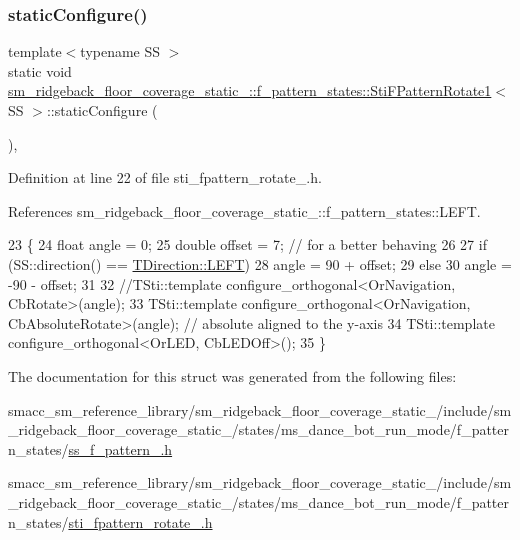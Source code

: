 \subsubsection{\texorpdfstring{static\+Configure()}{staticConfigure()}}
{\footnotesize\ttfamily template$<$typename SS $>$ \\
static void \hyperlink{classsm__ridgeback__floor__coverage__static__1_1_1f__pattern__states_1_1StiFPatternRotate1}{sm\+\_\+ridgeback\+\_\+floor\+\_\+coverage\+\_\+static\+\_\+::f\+\_\+pattern\+\_\+states\+::\+Sti\+F\+Pattern\+Rotate1}$<$ SS $>$\+::static\+Configure (\begin{DoxyParamCaption}{ }\end{DoxyParamCaption})\hspace{0.3cm}{\ttfamily [inline]}, {\ttfamily [static]}}



Definition at line 22 of file sti\+\_\+fpattern\+\_\+rotate\+\_.\+h.



References sm\+\_\+ridgeback\+\_\+floor\+\_\+coverage\+\_\+static\+\_\+::f\+\_\+pattern\+\_\+states\+::\+L\+E\+FT.


\begin{DoxyCode}
23       \{
24         \textcolor{keywordtype}{float} angle = 0;
25         \textcolor{keywordtype}{double} offset = 7; \textcolor{comment}{// for a better behaving}
26 
27         \textcolor{keywordflow}{if} (SS::direction() == \hyperlink{namespacesm__ridgeback__floor__coverage__static__1_1_1f__pattern__states_ad85e4f6b7cecf87bbe0eef96a899de72a684d325a7303f52e64011467ff5c5758}{TDirection::LEFT})
28           angle = 90 + offset;
29         \textcolor{keywordflow}{else}
30           angle = -90 - offset;
31 
32         \textcolor{comment}{//TSti::template configure\_orthogonal<OrNavigation, CbRotate>(angle);}
33         TSti::template configure\_orthogonal<OrNavigation, CbAbsoluteRotate>(angle); \textcolor{comment}{// absolute aligned to
       the y-axis}
34         TSti::template configure\_orthogonal<OrLED, CbLEDOff>();
35       \}
\end{DoxyCode}


The documentation for this struct was generated from the following files\+:\begin{DoxyCompactItemize}
\item 
smacc\+\_\+sm\+\_\+reference\+\_\+library/sm\+\_\+ridgeback\+\_\+floor\+\_\+coverage\+\_\+static\+\_/include/sm\+\_\+ridgeback\+\_\+floor\+\_\+coverage\+\_\+static\+\_/states/ms\+\_\+dance\+\_\+bot\+\_\+run\+\_\+mode/f\+\_\+pattern\+\_\+states/\hyperlink{sm__ridgeback__floor__coverage__static__1_2include_2sm__ridgeback__floor__coverage__static__1_2sef47342a2bdbaa835adb6637c605f7b6}{ss\+\_\+f\+\_\+pattern\+\_.\+h}\item 
smacc\+\_\+sm\+\_\+reference\+\_\+library/sm\+\_\+ridgeback\+\_\+floor\+\_\+coverage\+\_\+static\+\_/include/sm\+\_\+ridgeback\+\_\+floor\+\_\+coverage\+\_\+static\+\_/states/ms\+\_\+dance\+\_\+bot\+\_\+run\+\_\+mode/f\+\_\+pattern\+\_\+states/\hyperlink{sm__ridgeback__floor__coverage__static__1_2include_2sm__ridgeback__floor__coverage__static__1_2s0f7fec98f99b82a4193b505921cb2e0a}{sti\+\_\+fpattern\+\_\+rotate\+\_.\+h}\end{DoxyCompactItemize}

